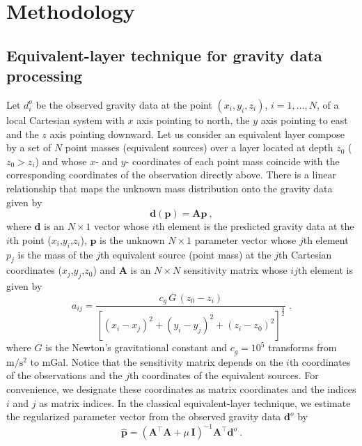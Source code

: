 \documentclass[manuscript,revised]{geophysics}
\begin{document}
\section*{Methodology}

\subsection{Equivalent-layer technique for gravity data processing}

Let $d^{o}_{i}$ be the observed gravity data at
the point $(x_{i}, y_{i}, z_{i})$, $i = 1, ..., N$, of a local Cartesian
system with $x$ axis pointing to north, the $y$ axis pointing to east and 
the $z$ axis pointing downward.
Let us consider an equivalent layer compose by a set of $N$ point masses 
(equivalent sources) over a layer located at depth $z_0$ ($z_0 >z_i$) and whose 
$x$- and $y$- coordinates of each point mass coincide with the corresponding coordinates 
of the observation directly above.
There is a linear relationship that maps the unknown mass distribution onto the gravity 
data given by
\begin{equation}
\mathbf{d}(\mathbf{p}) = \mathbf{A} \mathbf{p} \: ,
\label{eq:predicted-data-vector}
\end{equation}
where $\mathbf{d}$ is an $N \times 1$ vector whose $i$th element is the predicted gravity 
data at the $i$th point ($x_i$,$y_i$,$z_i$), $\mathbf{p}$ is the unknown $N \times 1$ 
parameter vector whose $j$th element $p_j$  is the mass of the $j$th equivalent source 
(point mass) at the $j$th Cartesian coordinates ($x_j$,$y_j$,$z_0$) and $\mathbf{A}$ 
is an $N \times N$  sensitivity matrix whose $ij$th element is given by 
\begin{equation}
a_{ij}= \frac{c_{g} \, G \, (z_{0} - z_{i})}{\left[(x_{i} - x_{j})^{2} +
(y_{i} - y_{j})^{2} +	(z_{i} - z_{0})^{2} \right]^{\frac{3}{2}}} \; .
\label{eq:aij}
\end{equation}
where $G$ is the Newton's gravitational constant and $c_{g} = 10^{5}$ 
transforms from $\mathrm{m/s^2}$ to mGal.
Notice that the sensitivity matrix depends on the $i$th coordinates of the observations 
and the $j$th coordinates of the equivalent sources. For convenience, we designate 
these coordinates as matrix coordinates and the indices $i$ and $j$ as matrix indices.
In the classical equivalent-layer technique, we estimate the regularized parameter vector 
from the observed gravity data $\mathbf{d}^{o}$ by
\begin{equation}
\hat{\mathbf{p}} = \left( \mathbf{A}^{\top}\mathbf{A} + 
\mu \, \mathbf{I} \right)^{-1}
\mathbf{A}^{\top} \mathbf{d}^{o} \: .
\label{eq:estimated-p-parameter-space}
\end{equation}
\end{document}
